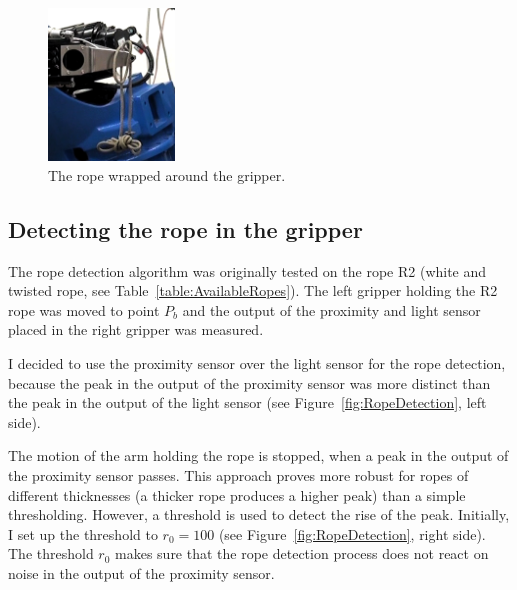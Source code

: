         \begin{figure}[h]
        \includegraphics[width=0.3\textwidth]{WrappedRopeCloseUp.png}
        \centering
        \caption{The rope wrapped around the gripper.}
        \label{fig:WrappedRopeCloseUp}
        \end{figure}


    \subsection{Detecting the rope in the gripper} \label{sec:DetectingTheRope}

        The rope detection algorithm was originally tested on the rope R2 (white and twisted rope, see Table~\ref{table:AvailableRopes}). The left gripper holding the R2 rope was moved to point $P_b$ and the output of the proximity and light sensor placed in the right gripper was measured.

        I decided to use the proximity sensor over the light sensor for the rope detection, because the peak in the output of the proximity sensor was more distinct than the peak in the output of the light sensor (see Figure~\ref{fig:RopeDetection}, left side).

        The motion of the arm holding the rope is stopped, when a peak in the output of the proximity sensor passes. This approach proves more robust for ropes of different thicknesses (a thicker rope produces a higher peak) than a simple thresholding. However, a threshold is used to detect the rise of the peak. Initially, I set up the threshold to $r_0 = 100$ (see Figure~\ref{fig:RopeDetection}, right side). The threshold $r_0$ makes sure that the rope detection process does not react on noise in the output of the proximity sensor.


